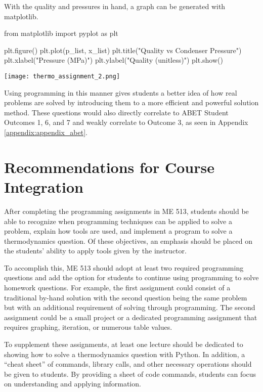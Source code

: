 \begin{tcolorbox}[breakable, enhanced jigsaw, title=ME 513: Assignment \ref{thermo_assignment_2}, 
    colframe=ksu-purple, colback=ksu-gray]
    With the quality and pressures in hand, a graph can be generated with matplotlib.

\begin{python}
from matplotlib import pyplot as plt

plt.figure()
plt.plot(p_list, x_list)
plt.title("Quality vs Condenser Pressure")
plt.xlabel("Pressure (MPa)")
plt.ylabel("Quality (unitless)")
plt.show()
\end{python}
\begin{center}
    \texttt{[image: thermo\_assignment\_2.png]}
\end{center}
\end{tcolorbox}

Using programming in this manner gives students a better idea of how real problems are solved by introducing
them to a more efficient and powerful solution method. These questions would also directly correlate to ABET 
Student Outcomes 1, 6, and 7 and weakly correlate to Outcome 3, as seen in Appendix \ref{appendix:appendix_abet}.

\section{Recommendations for Course Integration}

After completing the programming assignments in ME 513, students should be able to recognize when programming
techniques can be applied to solve a problem, explain how tools are used, and implement a program to solve 
a thermodynamics question. Of these objectives, an emphasis should be placed on the students' ability to apply
tools given by the instructor.

To accomplish this, ME 513 should adopt at least two required programming questions and add the option for 
students to continue using programming to solve homework questions. For example, the first assignment could
consist of a traditional by-hand solution with the second question being the same problem but with an additional
requirement of solving through programming. The second assignment could be a small project or a dedicated
programming assignment that requires graphing, iteration, or numerous table values. 

To supplement these assignments, at least
one lecture should be dedicated to showing how to solve a thermodynamics question with Python. In addition,
a ``cheat sheet'' of commands, library calls, and other necessary operations should be given to students.
By providing a sheet of code commands, students can focus on understanding and applying information.


